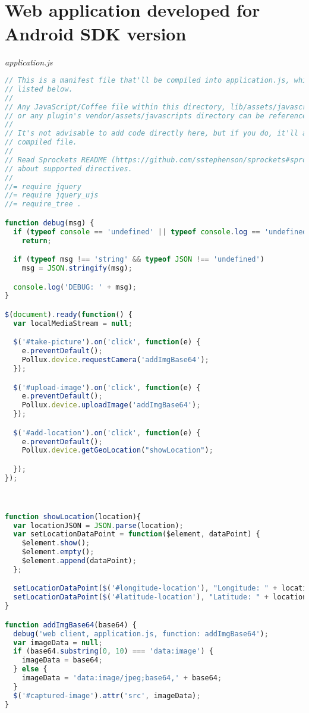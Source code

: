 \newpage

\section{\\ Web application developed for Android SDK version} \label{App:AppendixC}
\emph{application.js}
\begin{lstlisting}[language=JavaScript]
// This is a manifest file that'll be compiled into application.js, which will include all the files
// listed below.
//
// Any JavaScript/Coffee file within this directory, lib/assets/javascripts, vendor/assets/javascripts,
// or any plugin's vendor/assets/javascripts directory can be referenced here using a relative path.
//
// It's not advisable to add code directly here, but if you do, it'll appear at the bottom of the
// compiled file.
//
// Read Sprockets README (https://github.com/sstephenson/sprockets#sprockets-directives) for details
// about supported directives.
//
//= require jquery
//= require jquery_ujs
//= require_tree .

function debug(msg) {
  if (typeof console == 'undefined' || typeof console.log == 'undefined')
    return;

  if (typeof msg !== 'string' && typeof JSON !== 'undefined')
    msg = JSON.stringify(msg);

  console.log('DEBUG: ' + msg);
}

$(document).ready(function() {
  var localMediaStream = null;

  $('#take-picture').on('click', function(e) {
    e.preventDefault();
    Pollux.device.requestCamera('addImgBase64');
  });

  $('#upload-image').on('click', function(e) {
    e.preventDefault();
    Pollux.device.uploadImage('addImgBase64');
  });

  $('#add-location').on('click', function(e) {
    e.preventDefault();
    Pollux.device.getGeoLocation("showLocation");

  });
});



function showLocation(location){
  var locationJSON = JSON.parse(location);
  var setLocationDataPoint = function($element, dataPoint) {
    $element.show();
    $element.empty();
    $element.append(dataPoint);
  };

  setLocationDataPoint($('#longitude-location'), "Longitude: " + locationJSON.longitude);
  setLocationDataPoint($('#latitude-location'), "Latitude: " + locationJSON.latitude);
}

function addImgBase64(base64) {
  debug('web client, application.js, function: addImgBase64');
  var imageData = null;
  if (base64.substring(0, 10) === 'data:image') {
    imageData = base64;
  } else {
    imageData = 'data:image/jpeg;base64,' + base64;
  }
  $('#captured-image').attr('src', imageData);
}
\end{lstlisting}
